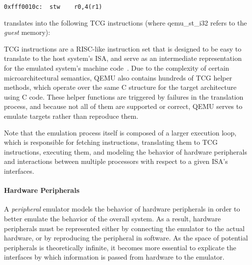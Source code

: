 

\begin{center}
\begin{lstlisting}[]
0xfff0010c:  stw    r0,4(r1)
\end{lstlisting}
\end{center}

\noindent
translates into the following TCG instructions (where qemu\_st\_i32 refers to the \emph{guest} memory):

\begin{center}

\end{center}

TCG instructions are a RISC-like instruction set that is designed to be easy to translate to the host system's ISA, and serve as an intermediate representation for the emulated system's machine code~\cite{tcg}.
Due to the complexity of certain microarchitectural semantics, QEMU also contains hundreds of TCG helper methods, which operate over the same C structure for the target architecture using C code.
These helper functions are triggered by failures in the translation process, and because not all of them are supported or correct, QEMU serves to emulate targets rather than reproduce them.

Note that the emulation process itself is composed of a larger execution loop, which is responsible for fetching instructions, translating them to TCG instructions, executing them, and modeling the behavior of hardware peripherals and interactions between multiple processors with respect to a given ISA's interfaces.

\paragraph{Hardware Peripherals}
\label{sec:periphs}

A \emph{peripheral} emulator models the behavior of hardware peripherals in order to better emulate the behavior of the overall system.
As a result, hardware peripherals must be represented either by connecting the emulator to the actual hardware, or by reproducing the peripheral in software.
As the space of potential peripherals is theoretically infinite, it becomes more essential to explicate the interfaces by which information is passed from hardware to the emulator.

